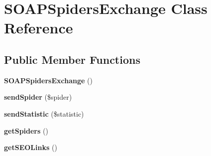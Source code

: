 \hypertarget{class_s_o_a_p_spiders_exchange}{\section{S\-O\-A\-P\-Spiders\-Exchange Class Reference}
\label{class_s_o_a_p_spiders_exchange}
}
\subsection*{Public Member Functions}
\begin{DoxyCompactItemize}
\item 
\hypertarget{class_s_o_a_p_spiders_exchange_a829a0adce80b49c431b8356d8a5819b4}{{\bfseries S\-O\-A\-P\-Spiders\-Exchange} ()}\label{class_s_o_a_p_spiders_exchange_a829a0adce80b49c431b8356d8a5819b4}

\item 
\hypertarget{class_s_o_a_p_spiders_exchange_acccb4227ead49e99ee69acf3e07f7d5a}{{\bfseries send\-Spider} (\$spider)}\label{class_s_o_a_p_spiders_exchange_acccb4227ead49e99ee69acf3e07f7d5a}

\item 
\hypertarget{class_s_o_a_p_spiders_exchange_a249fef51c925deaf1d5052e8b695567b}{{\bfseries send\-Statistic} (\$statistic)}\label{class_s_o_a_p_spiders_exchange_a249fef51c925deaf1d5052e8b695567b}

\item 
\hypertarget{class_s_o_a_p_spiders_exchange_a009bf5de24af5a103b4aa34544657cac}{{\bfseries get\-Spiders} ()}\label{class_s_o_a_p_spiders_exchange_a009bf5de24af5a103b4aa34544657cac}

\item 
\hypertarget{class_s_o_a_p_spiders_exchange_ad89ff84a2b29b0e4143d55a2f7b4d070}{{\bfseries get\-S\-E\-O\-Links} ()}\label{class_s_o_a_p_spiders_exchange_ad89ff84a2b29b0e4143d55a2f7b4d070}

\end{DoxyCompactItemize}
